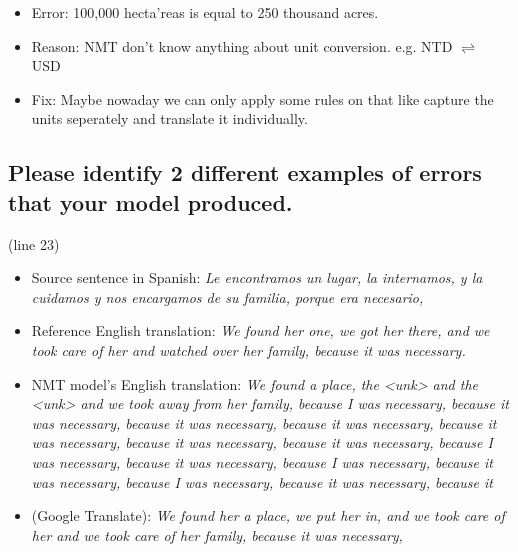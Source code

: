 \documentclass[12pt, letterpaper]{article}
\begin{document}
\begin{itemize}
  \item Error: 100,000 hecta'reas is equal to 250 thousand acres.
  \item Reason: NMT don't know anything about unit conversion. e.g. NTD $\rightleftharpoons$ USD
  \item Fix: Maybe nowaday we can only apply some rules on that like capture the units seperately and translate it individually.
\end{itemize}

\subsection{Please identify 2 different examples of errors that your model produced.}

(line 23)

\begin{itemize}
  \item Source sentence in Spanish: \textit{Le encontramos un lugar, la internamos, y la cuidamos y nos encargamos de su familia, porque era necesario,}
  \item Reference English translation: \textit{We found her one, we got her there,  and we took care of her  and watched over her family,  because it was necessary.}
  \item NMT model's English translation: \textit{We found a place, the <unk> and the <unk> and we took away from her family, because I was necessary, because it was necessary, because it was necessary, because it was necessary, because it was necessary, because it was necessary, because it was necessary, because I was necessary, because it was necessary, because I was necessary, because it was necessary, because I was necessary, because it was necessary, because it}
  \item (Google Translate): \textit{We found her a place, we put her in, and we took care of her and we took care of her family, because it was necessary,}
\end{itemize}
\end{document}
